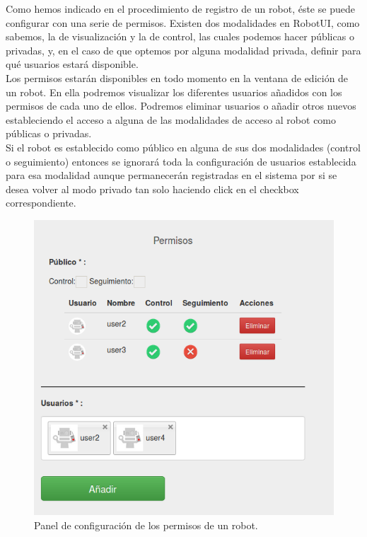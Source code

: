 Como hemos indicado en el procedimiento de registro de un robot, éste se puede configurar  con una serie de permisos. Existen dos modalidades en RobotUI, como sabemos, la de visualización y la de control,
las cuales podemos hacer públicas o privadas, y, en el caso de que optemos por alguna modalidad privada, definir para qué usuarios estará disponible.\\

Los permisos estarán disponibles en todo momento en la ventana de edición de un robot. En ella podremos visualizar los diferentes usuarios añadidos con los permisos de cada uno de ellos. Podremos eliminar usuarios o
añadir otros nuevos estableciendo el acceso a alguna de las modalidades de acceso al robot como públicas o privadas.\\

Si el robot es establecido como público en alguna de sus dos modalidades (control o seguimiento) entonces se ignorará toda la configuración de usuarios establecida para esa modalidad aunque
permanecerán registradas en el sistema por si se desea volver al modo privado tan solo haciendo click en el checkbox correspondiente.\\

\begin{figure}[H]
  \begin{center}
    \includegraphics[scale=0.5]{imagenes/manual-usuario/panel-permisos.png}
  \end{center}
  \caption{Panel de configuración de los permisos de un robot.}
  \label{website:creacion-robot}
\end{figure}


